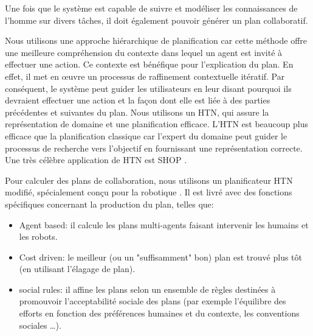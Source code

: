 \documentclass[a4paper,11pt,twoside]{StyleThese}
\begin{document}


Une fois que le système est capable de suivre et modéliser les connaissances de l'homme sur divers tâches, il doit également pouvoir générer un plan collaboratif.

Nous utilisons une approche hiérarchique de planification car cette méthode offre une meilleure compréhension du contexte dans lequel un agent est invité à effectuer une action. Ce contexte est bénéfique pour l'explication du plan. En effet, il met en œuvre un processus de raffinement contextuelle itératif. Par conséquent, le système peut guider les utilisateurs en leur disant pourquoi ils devraient effectuer une action et la façon dont elle est liée à des parties précédentes et suivantes du plan.
Nous utilisons un HTN, qui assure la représentation de domaine et une planification efficace.
L'HTN est beaucoup plus efficace que la planification classique car l'expert du domaine peut guider le processus de recherche vers l'objectif en fournissant une représentation correcte.
Une très célèbre application de HTN est SHOP \cite{Nau99}.

Pour calculer des plans de collaboration, nous utilisons un planificateur HTN modifié, spécialement conçu pour la robotique \cite{lallement14}.
Il est livré avec des fonctions spécifiques concernant la production du plan, telles que:

\begin{itemize}
\item Agent based: il calcule les plans multi-agents faisant intervenir les humains et les robots.
\item Cost driven: le meilleur (ou un "suffisamment" bon) plan est trouvé plus tôt (en utilisant l'élagage de plan).
\item social rules: il affine les plans selon un ensemble de règles destinées à promouvoir l'acceptabilité sociale des plans (par exemple l'équilibre des efforts  en fonction des préférences humaines et du contexte, les conventions sociales \ldots).
\end{itemize}
\end{document}
